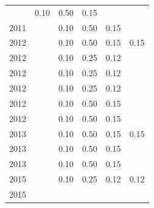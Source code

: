 \begin{table}[H]
\begin{tabular}{| l | c | c | c | c | c |}
          &
          0.10
          &
          0.50
          &
          0.15
          &
          \\
            2011
          &
          
          &
          0.10
          &
          0.50
          &
          0.15
          &
          \\
\hline
            2012
          &
          
          &
          0.10
          &
          0.50
          &
          0.15
          &
            {\color{red} 0.15}
          \\
            2012
          &
          
          &
          0.10
          &
          0.25
          &
          0.12
          &
          \\
            2012
          &
          
          &
          0.10
          &
          0.25
          &
          0.12
          &
          \\
            2012
          &
          
          &
          0.10
          &
          0.25
          &
          0.12
          &
          \\
            2012
          &
          
          &
          0.10
          &
          0.50
          &
          0.15
          &
          \\
            2012
          &
          
          &
          0.10
          &
          0.50
          &
          0.15
          &
          \\
\hline
            2013
          &
          
          &
          0.10
          &
          0.50
          &
          0.15
          &
            {\color{red} 0.15}
          \\
            2013
          &
          
          &
          0.10
          &
          0.50
          &
          0.15
          &
          \\
            2013
          &
          
          &
          0.10
          &
          0.50
          &
          0.15
          &
          \\
\hline
            2015
          &
          
          &
          0.10
          &
          0.25
          &
          0.12
          &
            {\color{red} 0.12}
          \\
            2015
          &
          

\end{tabular}
\end{table}
